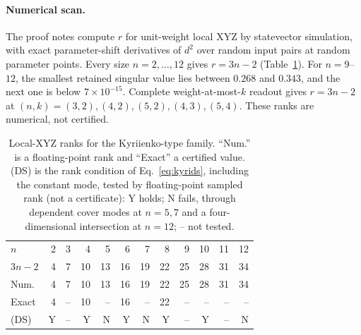 \paragraph{Numerical scan.}
The proof notes compute $r$ for unit-weight local XYZ by statevector
simulation, with exact parameter-shift derivatives of $d^2$ over
random input pairs at random parameter points. Every size
$n=2,\ldots,12$ gives $r=3n-2$ (Table~\ref{tab:kyriscan}). For
$n=9$--$12$, the smallest retained singular value lies between $0.268$
and $0.343$, and the next one is below $7\times10^{-15}$. Complete
weight-at-most-$k$ readout gives $r=3n-2$ at
$(n,k)=(3,2),(4,2),(5,2),(4,3),(5,4)$. These ranks are numerical,
not certified.

\begin{table}[b]
\caption{Local-XYZ ranks for the Kyriienko-type family. ``Num.'' is a
floating-point rank and ``Exact'' a certified value. (DS) is the rank
condition of Eq.~\eqref{eq:kyrids}, including the constant mode,
tested by floating-point sampled rank (not a certificate): Y holds;
N fails, through dependent cover modes at $n=5,7$ and a
four-dimensional intersection at $n=12$; -- not tested.}
\label{tab:kyriscan}
\setlength{\tabcolsep}{3pt}
\begin{tabular}{lrrrrrrrrrrr}
\toprule
$n$ & 2&3&4&5&6&7&8&9&10&11&12\\
$3n-2$ & 4&7&10&13&16&19&22&25&28&31&34\\
Num. & 4&7&10&13&16&19&22&25&28&31&34\\
Exact & 4&--&10&--&16&--&22&--&--&--&--\\
(DS) & Y&--&Y&N&Y&N&Y&--&Y&--&N\\
\bottomrule
\end{tabular}
\end{table}

